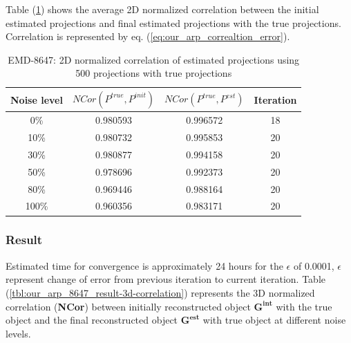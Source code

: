\documentclass[twoside]{iitbreport}
\begin{document}
Table (\ref{tbl:our_arp_8647_result-2d-correlation}) shows the average 2D normalized correlation between the initial estimated projections and final estimated projections with the true projections. Correlation is represented by eq. (\ref{eq:our_arp_correaltion_error}). 
\begin{table}[H]
    \centering
     \begin{tabular}{||c c c c ||} 
             \hline
             Noise level & $NCor(P^{true},P^{init})$  &   $ NCor(P^{true},P^{est})$ & Iteration \\
            \hline\hline
            0\% & 0.980593 & 0.996572 & 18 \\
            \hline
            10\% &  0.980732 & 0.995853 & 20  \\
            \hline
            30\% &  0.980877 &  0.994158 & 20  \\
            \hline
            50\% & 0.978696 & 0.992373 & 20 \\
            \hline
            80\% & 0.969446 & 0.988164 & 20 \\
            \hline
            100\%& 0.960356 & 0.983171 & 20 \\
            \hline
    \end{tabular}
    \caption{EMD-8647: 2D normalized correlation of estimated projections using 500 projections with true projections }
    \label{tbl:our_arp_8647_result-2d-correlation}
\end{table}

\subsubsection{\textbf{Result}}

Estimated time for convergence is approximately 24 hours for the $\epsilon$  of 0.0001, $\epsilon$ represent change of error from previous iteration to current iteration. Table (\ref{tbl:our_arp_8647_result-3d-correlation}) represents the 3D normalized correlation (\textbf{NCor}) between initially reconstructed object $\boldsymbol{G^{int}}$ with the true object and the final reconstructed object $\boldsymbol{G^{est}}$ with true object at different noise levels. 
\end{document}
